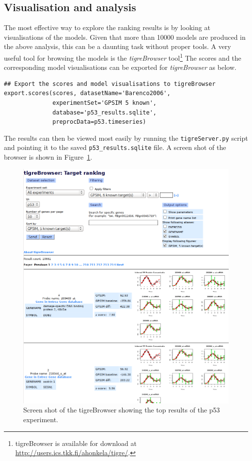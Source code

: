 \documentclass[11pt]{article}
\begin{document}
\subsection{Visualisation and analysis}

The most effective way to explore the ranking results is by looking at
visualisations of the models.  Given that more than 10000 models are produced in
the above analysis, this can be a daunting task without proper tools.
A very useful tool for browsing the models is the \emph{tigreBrowser}
tool\footnote{tigreBrowser is available for download at
  \url{http://users.ics.tkk.fi/ahonkela/tigre/}.}  The scores and the
corresponding model visualisations can be exported for
\emph{tigreBrowser} as below.

\begin{lstlisting}[frame=single]
## Export the scores and model visualisations to tigreBrowser
export.scores(scores, datasetName='Barenco2006',
              experimentSet='GPSIM 5 known',
              database='p53_results.sqlite',
              preprocData=p53.timeseries)
\end{lstlisting}

The results can then be viewed most easily by running the
\texttt{tigreServer.py} script and pointing it to the saved
\texttt{p53\_results.sqlite} file.  A screen shot of the
browser is shown in Figure~\ref{fig:browser_screenshot}.

\begin{figure}[htbp]
  \centering
  \includegraphics[width=\textwidth]{browser_screenshot.png}
  \caption{Screen shot of the tigreBrowser showing the top results of
    the p53 experiment.}
  \label{fig:browser_screenshot}
\end{figure}
\end{document}
